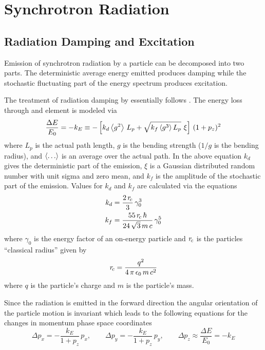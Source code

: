 \chapter{Synchrotron Radiation}

\section{Radiation Damping and Excitation}
\label{s:radiation}

Emission of synchrotron radiation by a particle can be decomposed into two parts. The deterministic
average energy emitted produces damping while the stochastic fluctuating part of the energy spectrum
produces excitation\cite{b:jowett}.

The treatment of radiation damping by \bmad essentially follows \mad. The energy loss through and
element is modeled via
\begin{equation}
  \frac{\Delta E}{E_0} = 
  -k_E \equiv -\left[ k_d \left\langle g^2 \right\rangle \, L_p + \sqrt{k_f \left\langle g^3 \right\rangle L_p} \,\, \xi \right] \, (1 + p_z)^2
  \label{deekk}
\end{equation}
where $L_p$ is the actual path length, $g$ is the bending strength ($1/g$ is the bending radius),
and $\left\langle \ldots \right\rangle$ is an average over the actual path.  In the above equation $k_d$ gives the
deterministic part of the emission, $\xi$ is a Gaussian distributed random number with unit sigma
and zero mean, and $k_f$ is the amplitude of the stochastic part of the emission. Values for $k_d$
and $k_f$ are calculated via the equations
\begin{align}
  k_d &= \frac{2 \, r_{\!c}}{3} \, \gamma_0^3
    \label{k2r3g} \\
  k_f &= \frac{55 \, r_{\!c} \, \hbar}{24 \, \sqrt{3} \, m \, c} \, \gamma_0^5
    \label{k55rh}
\end{align}
where $\gamma_0$ is the energy factor of an on-energy particle and $r_{\!c}$ is the particles
``classical radius'' given by
\begin{equation}
  r_{\!c} = \frac{q^2}{4 \, \pi \, \epsilon_0 \, m \, c^2} 
  \label{rq4pe}
\end{equation}
where $q$ is the particle's charge and $m$ is the particle's mass.

Since the radiation is emitted in the forward direction the angular orientation of the particle
motion is invariant which leads to the following equations for the changes in momentum phase space
coordinates
\begin{equation}
  \Delta p_x = -\frac{k_E}{1 + p_z} \, p_x , \qquad
  \Delta p_y = -\frac{k_E}{1 + p_z} \, p_y, \qquad
  \Delta p_z \approx \frac{\Delta E}{E_0} = -k_E 
  \label{pk1pp}
\end{equation}

